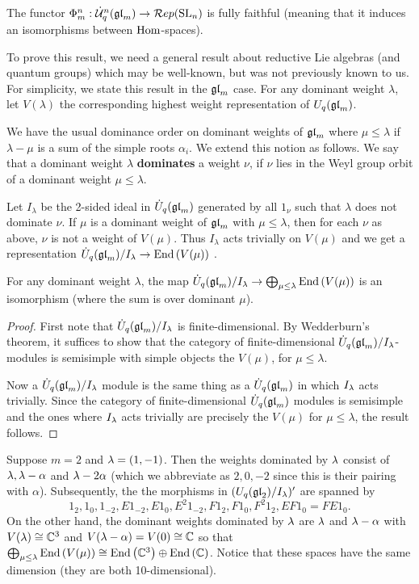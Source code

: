 \documentclass[11pt]{amsart}
\begin{document}
\begin{thm}\label{th:functorfullyfaithful}
The functor $\Phi_m^n: \dot{{\mathcal{U}}}_q^n({\mathfrak{gl}}_m) \rightarrow \mathcal{R}ep({\rm{SL}}_n)$ is fully faithful (meaning that it induces an isomorphisms between $\operatorname{Hom}$-spaces).
\end{thm}

To prove this result, we need a general result about reductive Lie algebras (and quantum groups) which may be well-known, but was not previously known to us.   For simplicity, we state this result in the $ {\mathfrak{gl}}_m $ case.  For any dominant weight $ \lambda $, let $V(\lambda)$ the corresponding highest weight representation of $ U_q({\mathfrak{gl}}_m)$.

We have the usual dominance order on dominant weights of $ {\mathfrak{gl}}_m $ where $ \mu \le \lambda $ if $ \lambda - \mu $ is a sum of the simple roots $ \alpha_i $.  We extend this notion as follows.  We say that a dominant weight $ \lambda $ \textbf{dominates} a weight $ \nu $, if $ \nu $ lies in the Weyl group orbit of a dominant weight $ \mu \le \lambda $.

Let $ I_\lambda $ be the 2-sided ideal in $\dot{{U}}_q({\mathfrak{gl}}_m)$ generated by all $ 1_\nu $ such that $ \lambda $ does not dominate $ \nu $. If $ \mu $ is a dominant weight of $ {\mathfrak{gl}}_m $ with $ \mu \le \lambda $, then for each $ \nu $ as above, $ \nu $ is not a weight of $V(\mu)$.  Thus $ I_\lambda $ acts trivially on $ V(\mu) $ and we get a representation $  \dot{{U}}_q({\mathfrak{gl}}_m)/I_\lambda \rightarrow \operatorname{End}\left(V(\mu)\right) $ .

\begin{lem}
For any dominant weight $ \lambda $, the map $ \dot{{U}}_q({\mathfrak{gl}}_m) / I_\lambda \rightarrow \bigoplus_{\mu \le \lambda} \operatorname{End}\left(V(\mu)\right)$ is an isomorphism (where the sum is over dominant $\mu$).
\end{lem}
\begin{proof}
First note that $\dot{{U}}_q({\mathfrak{gl}}_m)/ I_\lambda $ is finite-dimensional. By Wedderburn's theorem, it suffices to show that the category of finite-dimensional $\dot{{U}}_q({\mathfrak{gl}}_m)/I_\lambda$-modules is semisimple with simple objects the $V(\mu)$, for $\mu \le \lambda$.

Now a $\dot{{U}}_q({\mathfrak{gl}}_m)/I_\lambda$ module is the same thing as a $\dot{{U}}_q({\mathfrak{gl}}_m) $ in which $I_\lambda$ acts trivially. Since the category of finite-dimensional $\dot{{U}}_q({\mathfrak{gl}}_m) $ modules is semisimple and the ones where $I_\lambda$ acts trivially are precisely the $ V(\mu) $ for $ \mu \le \lambda$, the result follows.
\end{proof}

\begin{example}
Suppose $m=2$ and $\lambda = (1,-1)$. Then the weights dominated by $\lambda$ consist of $\lambda, \lambda - \alpha$ and $\lambda-2\alpha$ (which we abbreviate as $2,0,-2$ since this is their pairing with $\alpha$). Subsequently, the the morphisms in $(U_q({\mathfrak{gl}}_2)/I_\lambda)'$ are spanned by 
$$1_2, 1_0, 1_{-2}, E 1_{-2}, E1_0, E^2 1_{-2}, F1_2, F1_0, F^2 1_2, EF1_0 = FE1_0.$$
On the other hand, the dominant weights dominated by $\lambda$ are $\lambda$ and $\lambda-\alpha$ with $V(\lambda) \cong {\mathbb{C}}^3$ and $V(\lambda-\alpha)=V(0) \cong {\mathbb{C}}$ so that $\bigoplus_{\mu \le \lambda} \operatorname{End}\left(V(\mu)\right) \cong \operatorname{End}\left({\mathbb{C}}^3\right) \oplus \operatorname{End}\left({\mathbb{C}}\right)$. Notice that these spaces have the same dimension (they are both 10-dimensional). 
\end{example}
\end{document}
